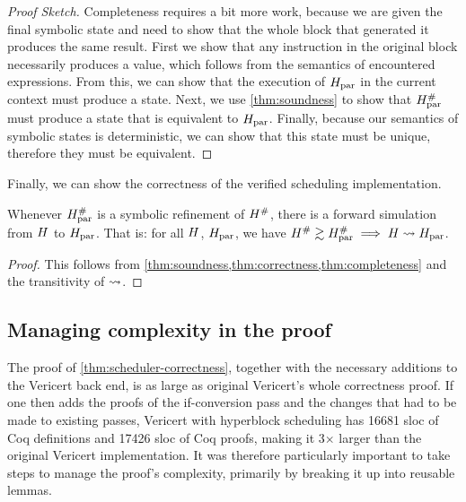 {\begin{lemma}
  \begin{proof}[Proof Sketch]
    Completeness requires a bit more work, because we are given the final
    symbolic state and need to show that the whole block that generated it
    produces the same result.  First we show that any instruction in the
    original block necessarily produces a value, which follows from the
    semantics of encountered expressions.  From this, we can show that the
    execution of $H_\text{par}$ in the current context must produce a state. Next, we
    use \cref{thm:soundness} to show that $H_\text{par}^{\#}$ must produce a
    state that is equivalent to $H_\text{par}$. Finally, because our semantics of
    symbolic states is deterministic, we can show that this state must be
    unique, therefore they must be equivalent.
  \end{proof}
\end{lemma}

Finally, we can show the correctness of the verified scheduling implementation.

\begin{theorem}\label{thm:scheduler-correctness}
  Whenever $H_\text{par}^{\#}$ is a symbolic refinement of $H^{\#}$,
  there is a forward simulation from $H$ to $H_\text{par}$. That is: for all
  $H$, $H_\text{par}$, we have
  $H^{\#} \gtrsim H_\text{par}^{\#} \implies H \mathrel{\leadsto} H_\text{par}$.

  \begin{proof}
    This follows from \cref{thm:soundness,thm:correctness,thm:completeness} and
    the transitivity of $\mathrel{\leadsto}$.
  \end{proof}
\end{theorem}

\subsection{Managing complexity in the proof}

The proof of \cref{thm:scheduler-correctness}, together with the necessary
additions to the Vericert back end, is as large as original Vericert's whole
correctness proof. If one then adds the proofs of the \gls{if-conversion} pass and the
changes that had to be made to existing passes, Vericert with hyperblock
scheduling has 16681 sloc of Coq definitions and 17426 sloc of Coq proofs,
making it 3$\times$ larger than the original Vericert implementation. It was
therefore particularly important to take steps to manage the proof's complexity,
primarily by breaking it up into reusable lemmas.

}
